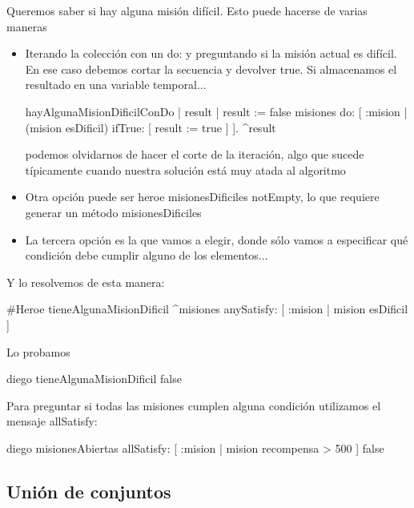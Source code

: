 \documentclass[a4paper,12pt]{book}
\begin{document}
Queremos saber si hay alguna misión difícil. Esto puede hacerse de varias maneras

\begin{itemize}
 \item Iterando la colección con un do: y preguntando si la misión actual es difícil. En ese caso debemos
 cortar la secuencia y devolver true. Si almacenamos el resultado en una variable temporal...
 
\begin{code}
hayAlgunaMisionDificilConDo
    | result | 
    result := false
    misiones do: [ :mision | (mision esDificil) 
                                 ifTrue: [ result := true ]
                 ].
    ^result
\end{code}

 podemos olvidarnos
 de hacer el corte de la iteración, algo que sucede típicamente cuando nuestra solución está muy atada al algoritmo
 \item Otra opción puede ser heroe misionesDificiles notEmpty, lo que requiere generar
 un método misionesDificiles
 \item La tercera opción es la que vamos a elegir, donde sólo vamos a especificar qué condición debe cumplir alguno
 de los elementos...
\end{itemize}

Y lo resolvemos de esta manera:

\begin{code}
#Heroe
tieneAlgunaMisionDificil
      ^misiones anySatisfy: [ :mision | mision esDificil ] 
\end{code}

\vspace{\baselineskip}
Lo probamos

\begin{code}
diego tieneAlgunaMisionDificil
    false
\end{code}

\vspace{\baselineskip}
Para preguntar si todas las misiones cumplen alguna condición utilizamos el mensaje allSatisfy:

\begin{code}
diego misionesAbiertas 
    allSatisfy: [ :mision | mision recompensa > 500 ]
    false
\end{code}

\vspace{\baselineskip}

\subsection{Unión de conjuntos}
\end{document}
